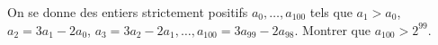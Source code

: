 On se donne des entiers strictement positifs $a_0, \ldots, a_{100}$ tels que $a_1 > a_0$, $a_2 = 3a_1 - 2a_0$, $a_3 = 3a_2 - 2a_1, \ldots, a_{100} = 3a_{99} - 2a_{98}$. Montrer que $a_{100} > 2^{99}$.
